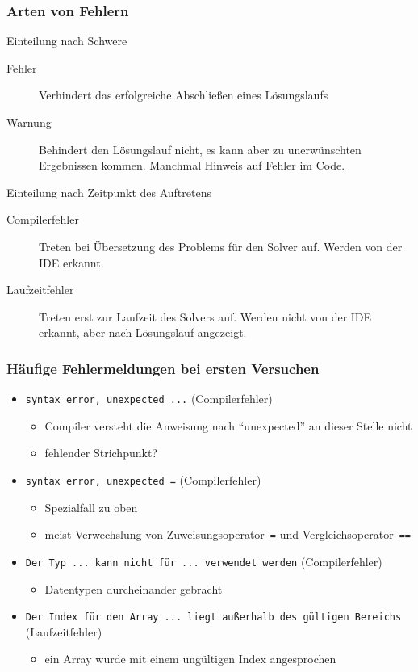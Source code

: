 \begin{frame}
 \frametitle{Arten von Fehlern}
 \begin{block}{Einteilung nach Schwere}
  \begin{description}
   \item[Fehler] Verhindert das erfolgreiche Abschließen eines Lösungslaufs
   \item[Warnung] Behindert den Lösungslauf nicht, es kann aber zu unerwünschten Ergebnissen kommen. Manchmal Hinweis auf Fehler im Code.
  \end{description}
 \end{block}
 \begin{block}{Einteilung nach Zeitpunkt des Auftretens}
  \begin{description}
   \item[Compilerfehler] Treten bei Übersetzung des Problems für den Solver auf. Werden von der IDE erkannt.
   \item[Laufzeitfehler] Treten erst zur Laufzeit des Solvers auf. Werden nicht von der IDE erkannt, aber nach Lösungslauf angezeigt.
  \end{description}
 \end{block}
\end{frame}

\begin{frame}
 \frametitle{Häufige Fehlermeldungen bei ersten Versuchen}
 \begin{itemize}
  \item \texttt{syntax error, unexpected ...} (Compilerfehler)
  \begin{itemize}
   \item Compiler versteht die Anweisung nach "`unexpected"' an dieser Stelle nicht
   \item fehlender Strichpunkt?
  \end{itemize}
  \item \texttt{syntax error, unexpected =} (Compilerfehler)
  \begin{itemize}
   \item Spezialfall zu oben
   \item meist Verwechslung von Zuweisungsoperator~\texttt{=} und Vergleichsoperator~\texttt{==}
  \end{itemize}
  \item \texttt{Der Typ ... kann nicht für ... verwendet werden} (Compilerfehler)
  \begin{itemize}
   \item Datentypen durcheinander gebracht
  \end{itemize}
  \item \texttt{Der Index für den Array ... liegt außerhalb des gültigen Bereichs} (Laufzeitfehler)
  \begin{itemize}
   \item ein Array wurde mit einem ungültigen Index angesprochen
  \end{itemize}
 \end{itemize}
\end{frame}

